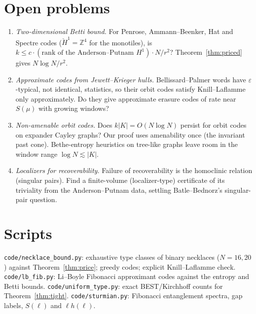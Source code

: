 \documentclass[11pt]{article}
\theoremstyle{definition}
\theoremstyle{remark}
\newcommand{\Z}{\mathbb Z}
\begin{document}
\section{Open problems}
\begin{enumerate}
\item \emph{Two-dimensional Betti bound.} For Penrose, Ammann--Beenker, Hat and Spectre codes ($\check H^1=\Z^4$ for the monotiles), is $k\le c\cdot(\text{rank of the Anderson--Putnam }H^1)\cdot N/r^2$? Theorem~\ref{thm:priced} gives $N\log N/r^2$.
\item \emph{Approximate codes from Jewett--Krieger hulls.} Bellissard--Palmer words have $\varepsilon$-typical, not identical, statistics, so their orbit codes satisfy Knill--Laflamme only approximately. Do they give approximate erasure codes of rate near $S(\mu)$ with growing windows?
\item \emph{Non-amenable orbit codes.} Does $k|K|=O(N\log N)$ persist for orbit codes on expander Cayley graphs? Our proof uses amenability once (the invariant past cone). Bethe-entropy heuristics on tree-like graphs leave room in the window range $\log N\lesssim|K|$.
\item \emph{Localizers for recoverability.} Failure of recoverability is the homoclinic relation (singular pairs). Find a finite-volume (localizer-type) certificate of its triviality from the Anderson--Putnam data, settling Batle--Bednorz's singular-pair question.
\end{enumerate}

\appendix
\section{Scripts}
\texttt{code/necklace\_bound.py}: exhaustive type classes of binary necklaces ($N=16,20$) against Theorem~\ref{thm:price}; greedy codes; explicit Knill--Laflamme check. \texttt{code/lb\_fib.py}: Li--Boyle Fibonacci approximant codes against the entropy and Betti bounds. \texttt{code/uniform\_type.py}: exact BEST/Kirchhoff counts for Theorem~\ref{thm:tight}. \texttt{code/sturmian.py}: Fibonacci entanglement spectra, gap labels, $S(\ell)$ and $\ell h(\ell)$.
\end{document}
